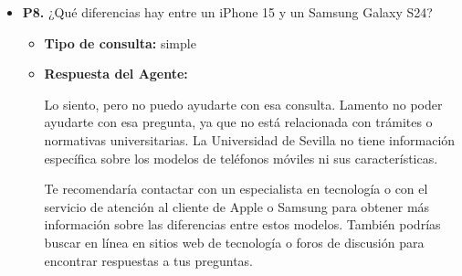 \documentclass{article}
\begin{document}
\begin{itemize}
\begin{itemize}
                Te recomendaría contactar con el departamento de cultura o comunicación de la universidad, ya que podrían tener recursos o sugerencias para crear contenido creativo como un poema para una felicitación de cumpleaños. También podrías buscar en línea o en redes sociales para encontrar ideas y ejemplos de poesías sobre la primavera que puedan inspirarte.
        \end{itemize}


  \item \textbf{P8.} ¿Qué diferencias hay entre un iPhone 15 y un Samsung Galaxy S24? \\
        \begin{itemize}
          \item \textbf{Tipo de consulta:} simple
          \item \textbf{Respuesta del Agente:}

                Lo siento, pero no puedo ayudarte con esa consulta. Lamento no poder ayudarte con esa pregunta, ya que no está relacionada con trámites o normativas universitarias. La Universidad de Sevilla no tiene información específica sobre los modelos de teléfonos móviles ni sus características.

                Te recomendaría contactar con un especialista en tecnología o con el servicio de atención al cliente de Apple o Samsung para obtener más información sobre las diferencias entre estos modelos. También podrías buscar en línea en sitios web de tecnología o foros de discusión para encontrar respuestas a tus preguntas.
        \end{itemize}


\end{itemize}
\end{document}
